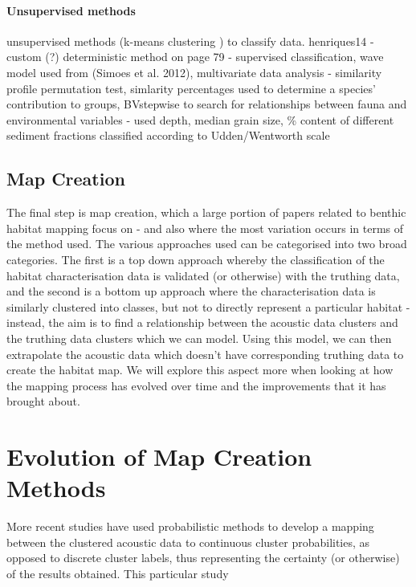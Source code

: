 \documentclass[12pt]{article}
\begin{document}
\begin{multicols}{2}
            \paragraph{Unsupervised methods}
            unsupervised methods (k-means clustering \citep{henriques14}) to classify data.
            henriques14 - custom (?) deterministic method on page 79 - supervised classification, wave model used from (Simoes et al. 2012), multivariate data analysis - similarity profile permutation test, simlarity percentages used to determine a species' contribution to groups, BVstepwise to search for relationships between fauna and environmental variables - used depth, median grain size, \% content of different sediment fractions classified according to Udden/Wentworth scale\citep{henriques14}

            \subsection{Map Creation}
            The final step is map creation, which a large portion of papers related to benthic habitat mapping focus on - and also where the most variation occurs in terms of the method used. The various approaches used can be categorised into two broad categories. The first is a top down approach whereby the classification of the habitat characterisation data is validated (or otherwise) with the truthing data, and the second is a bottom up approach where the characterisation data is similarly clustered into classes, but not to directly represent a particular habitat - instead, the aim is to find a relationship between the acoustic data clusters and the truthing data clusters which we can model. Using this model, we can then extrapolate the acoustic data which doesn't have corresponding truthing data to create the habitat map.\citep{ahsan11} We will explore this aspect more when looking at how the mapping process has evolved over time and the improvements that it has brought about.

            \section{Evolution of Map Creation Methods}

            More recent studies have used probabilistic methods to develop a mapping between the clustered acoustic data to continuous cluster probabilities, as opposed to discrete cluster labels, thus representing the certainty (or otherwise) of the results obtained. This particular study \citep{bender12}


\end{multicols}
\end{document}
